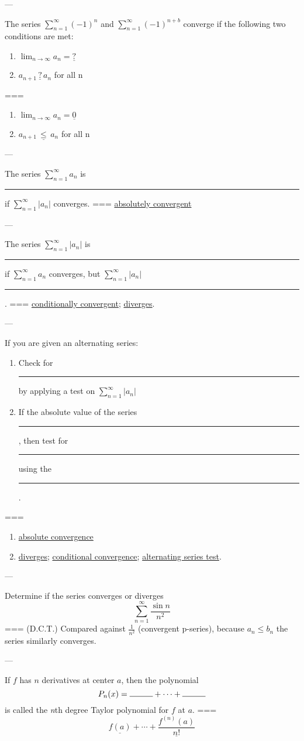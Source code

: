---


The series \(\sum_{n=1}^\infty {(-1)}^{n}\) and \(\sum_{n=1}^\infty
{(-1)}^{n+b}\) converge if the following two conditions are met:
\begin{enumerate}
  \item \(\lim_{n\to\infty} a_n=\underline{?}\)
  \item \(a_{n+1}\,\underline{?}\,a_n\) for all n
\end{enumerate}
===
\begin{enumerate}
  \item \(\lim_{n\to\infty} a_n=\underline{0}\)
  \item \(a_{n+1}\,\underline{\leq}\,a_n\) for all n
\end{enumerate}

---


The series \(\sum_{n=1}^\infty a_n\) is \rule{1cm}{0.15mm} if
\(\sum_{n=1}^\infty |a_n|\) converges.
===
\underline{absolutely convergent}

---

The series \(\sum_{n=1}^\infty |a_n|\) is \rule{1cm}{0.15mm} if
\(\sum_{n=1}^\infty a_n\) converges, but \(\sum_{n=1}^\infty |a_n|\)
\rule{1cm}{0.15mm}.
===
\underline{conditionally convergent}; \underline{diverges}.

---

If you are given an alternating series:
\begin{enumerate}
  \item Check for \rule{1cm}{0.15mm} by applying a test on \(\sum_{n=1}^\infty
    |a_n|\)
  \item If the absolute value of the series \rule{1cm}{0.15mm}, then test for
    \rule{1cm}{0.15mm} using the \rule{1cm}{0.15mm}.
\end{enumerate}
===
\begin{enumerate}
  \item \underline{absolute convergence}
  \item \underline{diverges}; \underline{conditional convergence};
    \underline{alternating series test}.
\end{enumerate}

---

Determine if the series converges or diverges
\[\sum_{n=1}^\infty \frac{\sin n}{n^2}\]
===
(D.C.T.) Compared against \(\frac{1}{n^2}\) (convergent p-series), because
\(a_n\leq b_n\) the series similarly converges.

---


If \(f\) has \(n\) derivatives at center \(a\), then the polynomial
\[P_n(x)=\rule{1cm}{0.15mm}+\cdots+\rule{1cm}{0.15mm}\]
is called the \textit{n}th degree Taylor polynomial for \(f\) at \(a\).
===
\[\underline{f(a)}+\cdots+\underline{\frac{f^{(n)}(a)}{n!}}\]
